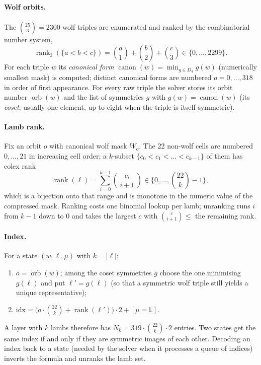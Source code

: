 \documentclass[11pt,a4paper]{article}
\newcommand{\Lb}{\mathsf{L}}
\DeclareMathOperator{\rank}{rank}
\DeclareMathOperator{\orb}{orb}
\DeclareMathOperator{\canon}{canon}
\begin{document}
\paragraph{Wolf orbits.} The $\binom{25}{3}=2300$ wolf triples are enumerated
and ranked by the combinatorial number system,
\[
\rank_3(\{a<b<c\}) = \binom a1 + \binom b2 + \binom c3 \in \{0,\dots,2299\}.
\]
For each triple $w$ its \emph{canonical form} $\canon(w)=\min_{g\in D_4} g(w)$
(numerically smallest mask) is computed; distinct canonical forms are numbered
$o=0,\dots,318$ in order of first appearance. For every raw triple the solver
stores its orbit number $\orb(w)$ and the list of symmetries $g$ with
$g(w)=\canon(w)$ (its \emph{coset}; usually one element, up to eight when the
triple is itself symmetric).

\paragraph{Lamb rank.} Fix an orbit $o$ with canonical wolf mask $W_o$. The 22
non-wolf cells are numbered $0,\dots,21$ in increasing cell order; a $k$-subset
$\{c_0<c_1<\dots<c_{k-1}\}$ of them has colex rank
\[
\rank(\ell) = \sum_{i=0}^{k-1}\binom{c_i}{\,i+1\,} \in \Big\{0,\dots,\binom{22}{k}-1\Big\},
\]
which is a bijection onto that range and is monotone in the numeric value of the
compressed mask. Ranking costs one binomial lookup per lamb; unranking runs $i$
from $k-1$ down to $0$ and takes the largest $c$ with $\binom{c}{i+1}\le$ the
remaining rank.

\paragraph{Index.} For a state $(w,\ell,\mu)$ with $k=|\ell|$:
\begin{enumerate}
\item $o=\orb(w)$; among the coset symmetries $g$ choose the one minimising
$g(\ell)$ and put $\ell'=g(\ell)$ (so that a symmetric wolf triple still yields a
unique representative);
\item $\mathrm{idx} = \big(o\cdot\binom{22}{k}+\rank(\ell')\big)\cdot 2 + [\mu=\Lb]$.
\end{enumerate}
A layer with $k$ lambs therefore has $N_k = 319\cdot\binom{22}{k}\cdot 2$
entries. Two states get the same index if and only if they are symmetric images
of each other. Decoding an index back to a state (needed by the solver when it
processes a queue of indices) inverts the formula and unranks the lamb set.
\end{document}
